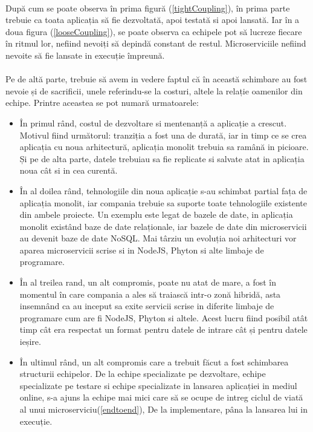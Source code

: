\documentclass[12pt]{report}
\begin{document}
  	\paragraph{}După cum se poate observa în prima figură (\ref{tightCoupling}), în prima parte trebuie ca toata aplicația să fie dezvoltată, apoi testată si apoi lansată. Iar în a doua figura (\ref{looseCoupling}), se poate observa ca echipele pot să lucreze fiecare în ritmul lor, nefiind nevoiți să depindă constant de restul. Microserviciile nefiind nevoite să fie lansate in execuție împreună.
	\paragraph{}Pe de altă parte, trebuie să avem in vedere faptul că în această schimbare au fost nevoie și de sacrificii, unele referindu-se la costuri, altele la relație oamenilor din echipe. Printre aceastea se pot numară urmatoarele:
  	\begin{itemize}
  	\item În primul rând, costul de dezvoltare si mentenanță a aplicație a crescut. Motivul fiind următorul: tranziția a fost una de durată, iar in timp ce se crea aplicația cu noua arhitectură, aplicația monolit trebuia sa ramână in picioare. Și pe de alta parte, datele trebuiau sa fie replicate si salvate atat in aplicația noua cât si in cea curentă.
  	\item În al doilea rând, tehnologiile din noua aplicație s-au schimbat partial fața de aplicația monolit, iar compania trebuie sa suporte toate tehnologiile existente din ambele proiecte. Un exemplu este legat de bazele de date, in aplicația monolit existând baze de date relaționale, iar bazele de date din microservicii au devenit baze de date NoSQL. Mai târziu un evoluția noi arhitecturi vor aparea microservicii scrise si in NodeJS, Phyton si alte limbaje de programare.
    \item În al treilea rand, un alt compromis, poate nu atat de mare, a fost în momentul în care compania a ales să traiască intr-o zonă hibridă, asta insemnând ca au inceput sa exite servicii scrise in diferite limbaje de programare cum are fi NodeJS, Phyton si altele. Acest lucru fiind posibil atât timp cât era respectat un format pentru datele de intrare cât și pentru datele ieșire.
  	\item În ultimul rând, un alt compromis care a trebuit făcut a fost schimbarea structurii echipelor. De la echipe specializate pe dezvoltare, echipe specializate pe testare si echipe specializate in lansarea aplicației in mediul online, s-a ajuns la echipe mai mici care să se ocupe de intreg ciclul de viată al unui microserviciu(\ref{endtoend}), De la implementare, pâna la lansarea lui in execuție.
  	\end{itemize}
\end{document}
